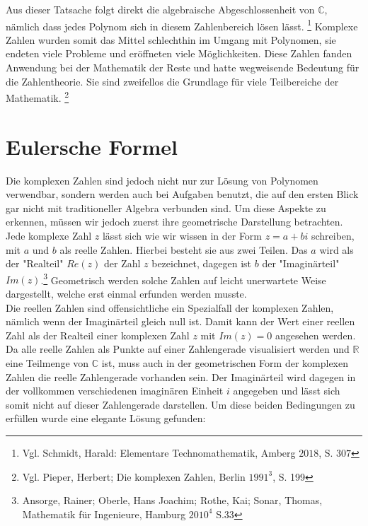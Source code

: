 \documentclass[a4paper,12pt]{article} %
\begin{document}
Aus dieser Tatsache folgt direkt die algebraische Abgeschlossenheit von $\mathbb{C}$, nämlich dass jedes Polynom sich in diesem Zahlenbereich lösen lässt.
\footnote{Vgl. Schmidt, Harald: Elementare Technomathematik, Amberg $2018$, S. $307$} 
Komplexe Zahlen wurden somit das Mittel schlechthin im Umgang mit Polynomen, sie endeten viele Probleme und eröffneten viele Möglichkeiten.
Diese Zahlen fanden Anwendung bei der Mathematik der Reste und hatte wegweisende Bedeutung für die Zahlentheorie.
Sie sind zweifellos die Grundlage für viele Teilbereiche der Mathematik. 
\footnote{Vgl. Pieper, Herbert; Die komplexen Zahlen, Berlin $1991^3$, S. 199}


\section{Eulersche Formel}

Die komplexen Zahlen sind jedoch nicht nur zur Lösung von Polynomen verwendbar, sondern werden auch bei Aufgaben benutzt, die auf den ersten Blick gar nicht mit traditioneller Algebra verbunden sind.
Um diese Aspekte zu erkennen, müssen wir jedoch zuerst ihre geometrische Darstellung betrachten.\\

Jede komplexe Zahl $z$ lässt sich wie wir wissen in der Form $z=a+bi$ schreiben, mit $a$ und $b$ als reelle Zahlen.
Hierbei besteht sie aus zwei Teilen.
Das $a$ wird als der "Realteil" $Re(z)$ der Zahl $z$ bezeichnet, dagegen ist $b$ der "{Imaginärteil}" $Im(z)$.\footnote{Ansorge, Rainer; Oberle, Hans Joachim; Rothe, Kai; Sonar, Thomas, Mathematik für Ingenieure, Hamburg $2010^4$ S.33}
Geometrisch werden solche Zahlen auf leicht unerwartete Weise dargestellt, welche erst einmal erfunden werden musste.\\

Die reellen Zahlen sind offensichtliche ein Spezialfall der komplexen Zahlen, nämlich wenn der Imaginärteil gleich null ist.
Damit kann der Wert einer reellen Zahl als der Realteil einer komplexen Zahl $z$ mit $Im(z)=0$ angesehen werden.
Da alle reelle Zahlen als Punkte auf einer Zahlengerade visualisiert werden und $\mathbb{R}$ eine Teilmenge von $\mathbb{C}$ ist, muss auch in der geometrischen Form der komplexen Zahlen die reelle Zahlengerade vorhanden sein.
Der Imaginärteil wird dagegen in der vollkommen verschiedenen imaginären Einheit $i$ angegeben und lässt sich somit nicht auf dieser Zahlengerade darstellen.
Um diese beiden Bedingungen zu erfüllen wurde eine elegante Lösung gefunden:\\
\end{document}
